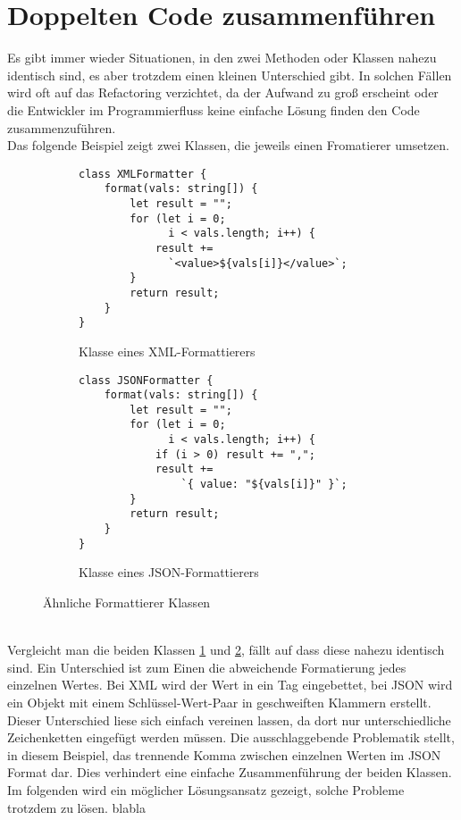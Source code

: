 \section{Doppelten Code zusammenführen}
Es gibt immer wieder Situationen, in den zwei Methoden oder Klassen nahezu identisch sind, es aber trotzdem einen kleinen Unterschied gibt.
In solchen Fällen wird oft auf das Refactoring verzichtet, da der Aufwand zu groß erscheint oder die Entwickler im Programmierfluss keine einfache Lösung finden den Code zusammenzuführen.\citep[S. 326 f.]{fiveLines.2023}\\
Das folgende Beispiel zeigt zwei Klassen, die jeweils einen Fromatierer umsetzen.
\begin{figure}[ht]
    \begin{subfigure}[t]{0.48\textwidth}
        \centering
        \begin{minipage}[t]{\linewidth}
            \begin{verbatim}
class XMLFormatter {
    format(vals: string[]) {
        let result = "";
        for (let i = 0;
              i < vals.length; i++) {
            result +=
              `<value>${vals[i]}</value>`;
        }
        return result;
    }
}
            \end{verbatim}
        \end{minipage}
        \caption{Klasse eines XML-Formattierers}
        \label{fig:XmlAnfang}
    \end{subfigure}
    \hfill
    \begin{subfigure}[t]{0.48\textwidth}
        \centering
        \begin{minipage}[t]{\linewidth}
            \begin{verbatim}
class JSONFormatter {
    format(vals: string[]) {
        let result = "";
        for (let i = 0;
              i < vals.length; i++) {
            if (i > 0) result += ",";
            result +=
                `{ value: "${vals[i]}" }`;
        }
        return result;
    }
}
            \end{verbatim}
        \end{minipage}
        \caption{Klasse eines JSON-Formattierers}
        \label{fig:JsonAnfang}
    \end{subfigure}
    \caption{Ähnliche Formattierer Klassen \citep[S. 327]{fiveLines.2023}}
    \label{fig:FormatterAnfang}
\end{figure}\\
Vergleicht man die beiden Klassen \ref{fig:XmlAnfang} und \ref{fig:JsonAnfang}, fällt auf dass diese nahezu identisch sind.
Ein Unterschied ist zum Einen die abweichende Formatierung jedes einzelnen Wertes.
Bei XML wird der Wert in ein Tag eingebettet, bei JSON wird ein Objekt mit einem Schlüssel-Wert-Paar in geschweiften Klammern erstellt.
Dieser Unterschied liese sich einfach vereinen lassen, da dort nur unterschiedliche Zeichenketten eingefügt werden müssen.
Die ausschlaggebende Problematik stellt, in diesem Beispiel, das trennende Komma zwischen einzelnen Werten im JSON Format dar.
Dies verhindert eine einfache Zusammenführung der beiden Klassen.
Im folgenden wird ein möglicher Lösungsansatz gezeigt, solche Probleme trotzdem zu lösen.
blabla

